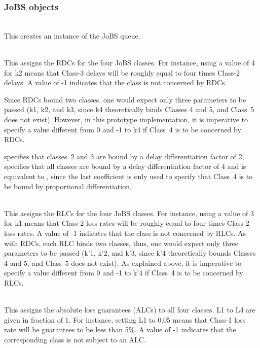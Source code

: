 \subsubsection{JoBS objects}
\begin{flushleft}
\\
This creates an instance of the JoBS queue. 

\\
This assigns the RDCs for the four JoBS classes. For instance, using a value 
of 4 for k2 means that Class-3 delays will be roughly equal to four times 
Class-2 delays. A value of -1 indicates that 
the class is not concerned by RDCs. 

 Since RDCs bound two classes, one would 
expect only three parameters to be passed (k1, k2, and k3, since k4 
theoretically binds Classes 4 and 5, and Class~5 does not exist). 
However, in this prototype implementation, it is imperative to specify a value 
different from 0 and -1 to k4 if Class~4 is to be concerned by RDCs. 

  specifies that classes~2 and 3 
are bound by a delay differentiation factor of 2,  
specifies that all classes are bound by a delay differentiation factor of 4 and
is equivalent to , since the last coefficient is 
only used to specify that Class~4 is to be bound by proportional 
differentiation.

\\
This assigns the RLCs for the four JoBS classes. 
For instance, using a value 
of 3 for k1 means that Class-2 loss rates will be roughly equal to four times 
Class-2 loss rates.
A value of -1 indicates that 
the class is not concerned by RLCs. As with RDCs, each RLC binds two classes, 
thus, one would 
expect only three parameters to be passed (k'1, k'2, and k'3, since k'4 
theoretically bounds Classes 4 and 5, and Class~5 does not exist). 
As explained above, it is imperative to specify a value 
different from 0 and -1 to k'4 if Class~4 is to be concerned by RLCs.

\\
This assigns the absolute loss guarantees (ALCs) to all four classes. L1 to L4 
are given in fraction of 1. For instance, setting L1 to 0.05 means that Class-1
loss rate will be guarantees to be less than 5\%. A value of -1 indicates that 
the corresponding class is not subject to an ALC.


\end{flushleft}
